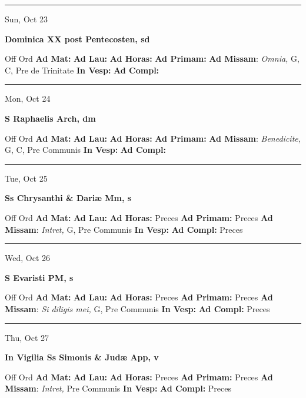 \documentclass[letterpaper, 10pt]{article}
\begin{document}
\hrule
\begin{center}
Sun, Oct 23
\end{center}\textbf{ \large Dominica XX post Pentecosten, \textnormal{\normalsize sd}}
\begin{justify}
Off Ord
\textbf{Ad Mat: }
\textbf{Ad Lau: }
\textbf{Ad Horas: }
\textbf{Ad Primam: }
\textbf{Ad Missam}: \textit{Omnia,} G, C, Pre de Trinitate
\textbf{In Vesp: }
\textbf{Ad Compl: }\end{justify}



\hrule
\begin{center}
Mon, Oct 24
\end{center}\textbf{ \large S Raphaelis Arch, \textnormal{\normalsize dm}}
\begin{justify}
Off Ord
\textbf{Ad Mat: }
\textbf{Ad Lau: }
\textbf{Ad Horas: }
\textbf{Ad Primam: }
\textbf{Ad Missam}: \textit{Benedicite,} G, C, Pre Communis
\textbf{In Vesp: }
\textbf{Ad Compl: }\end{justify}



\hrule
\begin{center}
Tue, Oct 25
\end{center}\textbf{ \large Ss Chrysanthi \& Dariæ Mm, \textnormal{\normalsize s}}
\begin{justify}
Off Ord
\textbf{Ad Mat: }
\textbf{Ad Lau: }
\textbf{Ad Horas: }Preces
\textbf{Ad Primam: }Preces
\textbf{Ad Missam}: \textit{Intret,} G, Pre Communis
\textbf{In Vesp: }
\textbf{Ad Compl: }Preces\end{justify}



\hrule
\begin{center}
Wed, Oct 26
\end{center}\textbf{ \large S Evaristi PM, \textnormal{\normalsize s}}
\begin{justify}
Off Ord
\textbf{Ad Mat: }
\textbf{Ad Lau: }
\textbf{Ad Horas: }Preces
\textbf{Ad Primam: }Preces
\textbf{Ad Missam}: \textit{Si diligis mei,} G, Pre Communis
\textbf{In Vesp: }
\textbf{Ad Compl: }Preces\end{justify}



\hrule
\begin{center}
Thu, Oct 27
\end{center}\textbf{ \large In Vigilia Ss Simonis \& Judæ App, \textnormal{\normalsize v}}
\begin{justify}
Off Ord
\textbf{Ad Mat: }
\textbf{Ad Lau: }
\textbf{Ad Horas: }Preces
\textbf{Ad Primam: }Preces
\textbf{Ad Missam}: \textit{Intret,} Pre Communis
\textbf{In Vesp: }
\textbf{Ad Compl: }Preces\end{justify}
\end{document}
